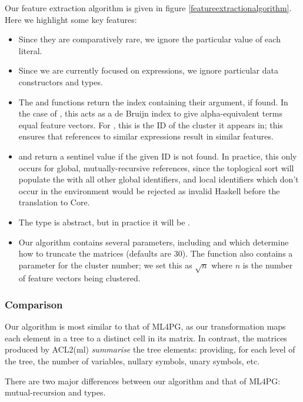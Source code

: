 Our feature extraction algorithm is given in figure \ref{featureextractionalgorithm}. Here we highlight some key features:

\begin{itemize}
  \item Since they are comparatively rare, we ignore the particular value of each literal.
  \item Since we are currently focused on expressions, we ignore particular data constructors and types.
  \item The  and  functions return the index containing their argument, if found. In the case of , this acts as a de Bruijn index to give alpha-equivalent terms equal feature vectors. For , this is the ID of the cluster it appears in; this ensures that references to similar expressions result in similar features.
  \item {} and  return a sentinel value  if the given ID is not found. In practice, this only occurs for global, mutually-recursive references, since the toplogical sort will populate the  with all other global identifiers, and local identifiers which don't occur in the environment would be rejected as invalid Haskell before the translation to Core.
  \item The  type is abstract, but in practice it will be .
  \item Our algorithm contains several parameters, including  and  which determine how to truncate the matrices (defaults are 30). The  function also contains a parameter for the cluster number; we set this as $\sqrt{n}$ where $n$ is the number of feature vectors being clustered.
\end{itemize}

\subsubsection{Comparison}

Our algorithm is most similar to that of ML4PG, as our transformation maps each element in a tree to a distinct cell in its matrix. In contrast, the matrices produced by ACL2(ml) \emph{summarise} the tree elements: providing, for each level of the tree, the number of variables, nullary symbols, unary symbols, etc.

There are two major differences between our algorithm and that of ML4PG: mutual-recursion and types.

